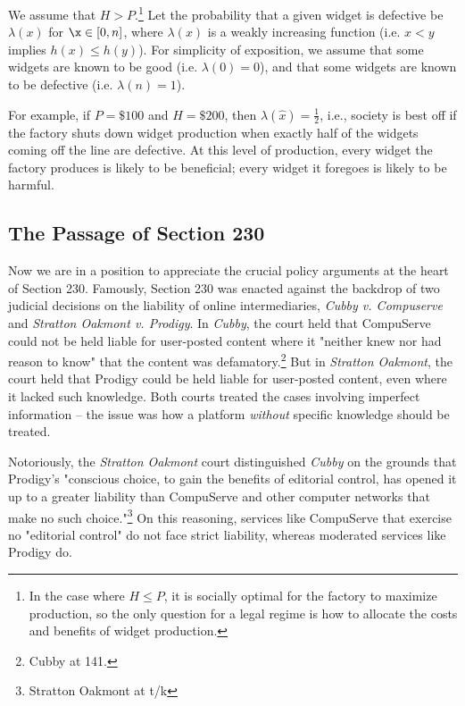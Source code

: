 We assume that $H > P$.\footnote{In the case where $H \le P$, it is socially optimal for the factory to maximize production, so the only question for a legal regime is how to allocate the costs and benefits of widget production.} Let the probability that a given widget is defective be $\lambda(x)$ for $\x \in [0,n]$, where $\lambda(x)$ is a weakly increasing function (i.e. $x < y$ implies $h(x) \le h(y)$). For simplicity of exposition, we assume that some widgets are known to be good (i.e. $\lambda(0) = 0$), and that some widgets are known to be defective (i.e. $\lambda(n) = 1$). 

For example, if $P = \$100$ and $H = \$200$, then $\lambda(\hat{x}) = \frac{1}{2}$, i.e., society is best off if the factory shuts down widget production when exactly half of the widgets coming off the line are defective. At this level of production, every widget the factory produces is likely to be beneficial; every widget it foregoes is likely to be harmful.



\subsection{The Passage of Section 230}

Now we are in a position to appreciate the crucial policy arguments at the heart of Section 230. Famously, Section 230 was enacted against the backdrop of two judicial decisions on the liability of online intermediaries, \emph{Cubby v. Compuserve} and \emph{Stratton Oakmont v. Prodigy}. In \emph{Cubby}, the court held that CompuServe could not be held liable for user-posted content where it "neither knew nor had reason to know" that the content was defamatory.\footnote{Cubby at 141.} But in \emph{Stratton Oakmont}, the court held that Prodigy could be held liable for user-posted content, even where it lacked such knowledge. Both courts treated the cases involving imperfect information -- the issue was how a platform \emph{without} specific knowledge should be treated.

Notoriously, the \emph{Stratton Oakmont} court distinguished \emph{Cubby} on the grounds that Prodigy's "conscious choice, to gain the benefits of editorial control, has opened it up to a greater liability than CompuServe and other computer networks that make no such choice."\footnote{Stratton Oakmont at t/k} On this reasoning, services like CompuServe that exercise no "editorial control" do not face strict liability, whereas moderated services like Prodigy do.

